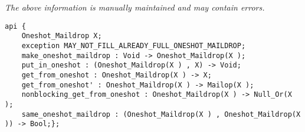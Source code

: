 \label{api:Oneshot\_Maildrop}

{\tiny \it The above information is manually maintained and may contain errors.}
\begin{verbatim}
api {
    Oneshot_Maildrop X;
    exception MAY_NOT_FILL_ALREADY_FULL_ONESHOT_MAILDROP;
    make_oneshot_maildrop : Void -> Oneshot_Maildrop(X );
    put_in_oneshot : (Oneshot_Maildrop(X ) , X) -> Void;
    get_from_oneshot : Oneshot_Maildrop(X ) -> X;
    get_from_oneshot' : Oneshot_Maildrop(X ) -> Mailop(X );
    nonblocking_get_from_oneshot : Oneshot_Maildrop(X ) -> Null_Or(X );
    same_oneshot_maildrop : (Oneshot_Maildrop(X ) , Oneshot_Maildrop(X )) -> Bool;};
\end{verbatim}
